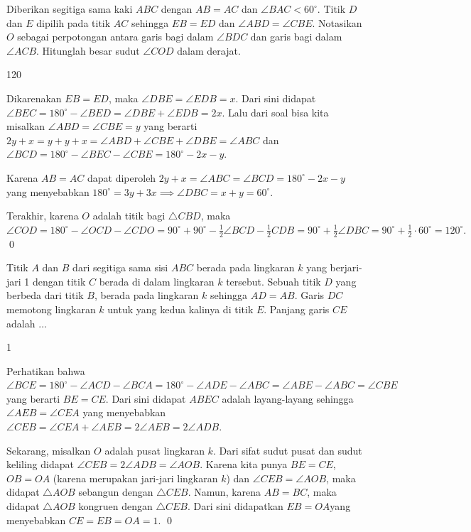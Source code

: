 \documentclass[12pt]{scrartcl}
\begin{document}
	\begin{soalbaru}
		Diberikan segitiga sama kaki $ABC$ dengan $AB = AC$ dan $\angle BAC < 60^\circ$. Titik $D$ dan $E$ dipilih pada titik $AC$ sehingga $EB = ED$ dan $\angle ABD = \angle CBE$. Notasikan $O$ sebagai perpotongan antara garis bagi dalam $\angle BDC$ dan garis bagi dalam $\angle ACB$. Hitunglah besar sudut $\angle COD$ dalam derajat. %
		\begin{jawaban}
		120
		\end{jawaban}
		\begin{solusi}
		Dikarenakan $EB=ED$, maka $\angle DBE =\angle EDB = x$. Dari sini didapat $\angle BEC = 180^\circ - \angle BED = \angle DBE + \angle EDB = 2x.$ Lalu dari soal bisa kita misalkan $\angle ABD = \angle CBE = y$ yang berarti  $2y+x=y+y+x=\angle ABD + \angle CBE + \angle DBE = \angle ABC$ dan $\angle BCD = 180^\circ - \angle BEC - \angle CBE = 180^\circ -2x-y$. 
		
		Karena $AB=AC$ dapat diperoleh $2y+x= \angle ABC=\angle BCD= 180^\circ -2x-y$ yang menyebabkan $180^\circ = 3y + 3x \implies \angle DBC = x+ y=60^\circ.$ 
		
		Terakhir, karena $O$ adalah titik bagi $\triangle CBD$, maka $\angle COD = 180^\circ - \angle OCD - \angle CDO = 90^\circ + 90^\circ - \frac{1}{2}\angle BCD - \frac{1}{2} CDB = 90^\circ + \frac{1}{2}\angle DBC = 90^\circ + \frac{1}{2}\cdot 60^\circ = 120^\circ.$ \qed
		\end{solusi}
	\end{soalbaru}
	
	\begin{soalbaru}
		Titik $A$ dan $B$ dari segitiga sama sisi $ABC$ berada pada lingkaran $k$ yang berjari-jari 1 dengan titik $C$ berada di dalam lingkaran $k$ tersebut. Sebuah titik $D$ yang berbeda dari titik $B$, berada pada lingkaran $k$ sehingga $AD=AB$. Garis $DC$ memotong lingkaran $k$ untuk yang kedua kalinya di titik $E$. Panjang garis $CE$ adalah $\dots$ %
		\begin{jawaban}
		1
		\end{jawaban}
		\begin{solusi}
		Perhatikan bahwa $\angle BCE = 180^\circ  - \angle ACD - \angle BCA = 180^\circ  - \angle ADE -\angle ABC = \angle ABE - \angle ABC = \angle CBE$ yang berarti $BE = CE$. Dari sini didapat $ABEC$ adalah layang-layang sehingga $\angle AEB = \angle CEA$ yang menyebabkan $\angle CEB = \angle CEA + \angle AEB= 2\angle AEB = 2\angle ADB$.
		
		Sekarang, misalkan $O$ adalah pusat lingkaran $k$. Dari sifat sudut pusat dan sudut keliling didapat $ \angle CEB= 2\angle ADB = \angle AOB$. Karena kita punya $BE=CE$, $OB = OA$ (karena merupakan jari-jari lingkaran $k$) dan $\angle CEB = \angle AOB$, maka didapat $\triangle AOB$ sebangun dengan $\triangle CEB$. Namun, karena $AB=BC$, maka didapat $\triangle AOB$ kongruen dengan $\triangle CEB$. Dari sini didapatkan $EB = OA$yang menyebabkan $CE = EB = OA = 1$. \qed
		\end{solusi}
	\end{soalbaru}
\end{document}
